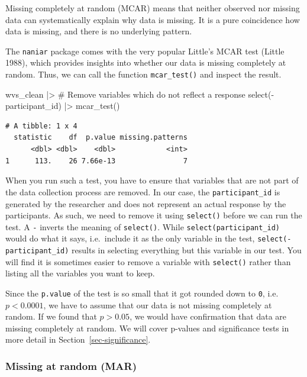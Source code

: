 \documentclass[
  letterpaper,
]{krantz}
\makeatletter
\newenvironment{Shaded}{\begin{snugshade}}{\end{snugshade}}
\newcommand{\CommentTok}[1]{\textcolor[rgb]{0.37,0.37,0.37}{#1}}
\newcommand{\FunctionTok}[1]{\textcolor[rgb]{0.28,0.35,0.67}{#1}}
\newcommand{\NormalTok}[1]{\textcolor[rgb]{0.00,0.23,0.31}{#1}}
\newcommand{\SpecialCharTok}[1]{\textcolor[rgb]{0.37,0.37,0.37}{#1}}
\newenvironment{kframe}{%
\medskip{}
\setlength{\fboxsep}{.8em}
 \def\at@end@of@kframe{}%
 \ifinner\ifhmode%
  \def\at@end@of@kframe{\end{minipage}}%
  \begin{minipage}{\columnwidth}%
 \fi\fi%
 \def\FrameCommand##1{\hskip\@totalleftmargin \hskip-\fboxsep
 \colorbox{shadecolor}{##1}\hskip-\fboxsep
     \hskip-\linewidth \hskip-\@totalleftmargin \hskip\columnwidth}%
 \MakeFramed {\advance\hsize-\width
   \@totalleftmargin\z@ \linewidth\hsize
   \@setminipage}}%
 {\par\unskip\endMakeFramed%
 \at@end@of@kframe}
\renewenvironment{Shaded}{\begin{kframe}}{\end{kframe}}
\makeatother
\begin{document}
Missing completely at random (MCAR) means that neither observed nor
missing data can systematically explain why data is missing. It is a
pure coincidence how data is missing, and there is no underlying
pattern.

The \texttt{naniar} package comes with the very popular Little's MCAR
test (Little 1988), which provides insights into whether our data is
missing completely at random. Thus, we can call the function
\texttt{mcar\_test()} and inspect the result.

\begin{Shaded}
\begin{Highlighting}[]
\NormalTok{wvs\_clean }\SpecialCharTok{|\textgreater{}}
  \CommentTok{\# Remove variables which do not reflect a response}
  \FunctionTok{select}\NormalTok{(}\SpecialCharTok{{-}}\NormalTok{participant\_id) }\SpecialCharTok{|\textgreater{}}
  \FunctionTok{mcar\_test}\NormalTok{()}
\end{Highlighting}
\end{Shaded}

\begin{verbatim}
# A tibble: 1 x 4
  statistic    df  p.value missing.patterns
      <dbl> <dbl>    <dbl>            <int>
1      113.    26 7.66e-13                7
\end{verbatim}

When you run such a test, you have to ensure that variables that are not
part of the data collection process are removed. In our case, the
\texttt{participant\_id} is generated by the researcher and does not
represent an actual response by the participants. As such, we need to
remove it using \texttt{select()} before we can run the test. A
\texttt{-} inverts the meaning of \texttt{select()}. While
\texttt{select(participant\_id)} would do what it says, i.e.~include it
as the only variable in the test, \texttt{select(-participant\_id)}
results in selecting everything but this variable in our test. You will
find it is sometimes easier to remove a variable with \texttt{select()}
rather than listing all the variables you want to keep.

Since the \texttt{p.value} of the test is so small that it got rounded
down to \texttt{0}, i.e.~\(p<0.0001\), we have to assume that our data
is not missing completely at random. If we found that \(p>0.05\), we
would have confirmation that data are missing completely at random. We
will cover p-values and significance tests in more detail in
Section~\ref{sec-significance}.

\subsubsection{Missing at random (MAR)}\label{sec-missing-at-random-mar}
\end{document}

